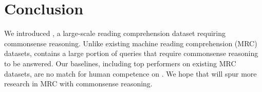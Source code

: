 \section{Conclusion}
We introduced \ReCoRD, a large-scale reading comprehension dataset requiring commonsense reasoning.
Unlike existing machine reading comprehension (MRC) datasets, \ReCoRD contains a large portion of queries that require commonsense reasoning to be answered.
Our baselines, including top performers on existing MRC datasets, are no match for human competence on \ReCoRD.
We hope that \ReCoRD will spur more research in MRC with commonsense reasoning.%

\clearpage


